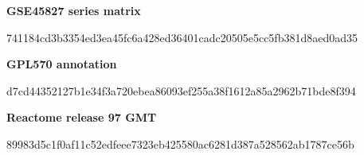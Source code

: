 \noindent\textbf{GSE45827 series matrix}\par{\small\ttfamily 741184cd3b3354ed3ea45fc6a428ed36\newline 401cadc20505e5cc5fb381d8aed0ad35\par}\medskip
\noindent\textbf{GPL570 annotation}\par{\small\ttfamily d7cd44352127b1e34f3a720ebea86093\newline ef255a38f1612a85a2962b71bde8f394\par}\medskip
\noindent\textbf{Reactome release 97 GMT}\par{\small\ttfamily 89983d5c1f0af11c52edfeee7323eb42\newline 5580ac6281d387a528562ab1787ce56b\par}\medskip
